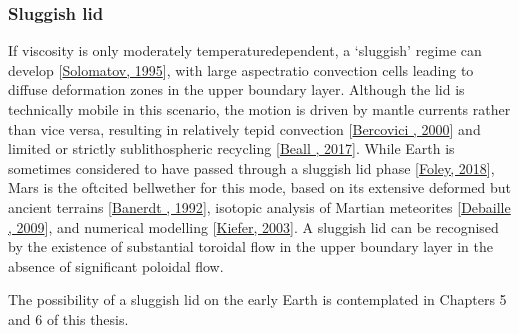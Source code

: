 \documentclass[letterpaper,10pt,english]{jupyterBook}
\begin{document}
\subsubsection{Sluggish lid}
\label{\detokenize{content/chapter_01_background/main:sluggish-lid}}
\sphinxAtStartPar
If viscosity is only moderately temperature\sphinxhyphen{}dependent, a ‘sluggish’ regime can develop {[}\hyperlink{cite.references:id360}{Solomatov, 1995}{]}, with large aspect\sphinxhyphen{}ratio convection cells leading to diffuse deformation zones in the upper boundary layer. Although the lid is technically mobile in this scenario, the motion is driven by mantle currents rather than vice versa, resulting in relatively tepid convection {[}\hyperlink{cite.references:id307}{Bercovici , 2000}{]} and limited or strictly sub\sphinxhyphen{}lithospheric recycling {[}\hyperlink{cite.references:id517}{Beall , 2017}{]}. While Earth is sometimes considered to have passed through a sluggish lid phase {[}\hyperlink{cite.references:id419}{Foley, 2018}{]}, Mars is the oft\sphinxhyphen{}cited bellwether for this mode, based on its extensive deformed but ancient terrains {[}\hyperlink{cite.references:id549}{Banerdt , 1992}{]}, isotopic analysis of Martian meteorites {[}\hyperlink{cite.references:id547}{Debaille , 2009}{]}, and numerical modelling {[}\hyperlink{cite.references:id548}{Kiefer, 2003}{]}. A sluggish lid can be recognised by the existence of substantial toroidal flow in the upper boundary layer in the absence of significant poloidal flow.

\sphinxAtStartPar
The possibility of a sluggish lid on the early Earth is contemplated in Chapters 5 and 6 of this thesis.
\end{document}

